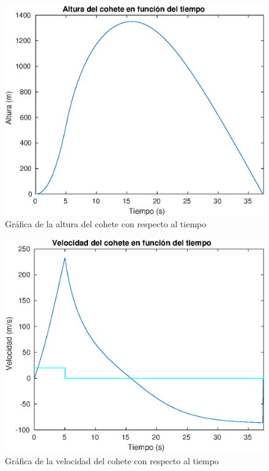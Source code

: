 \documentclass[12pt,letterpaper]{article}
\begin{document}
\begin{figure}[ht!]
  \centering
  \includegraphics[width=0.5\linewidth]{pictures/Ejercicio3/altura_cohete_vs_tiempo.eps}
  \caption{Gráfica de la altura del cohete con respecto al tiempo}
  \label{fig:alt_cohete}
\end{figure}



\begin{figure}[ht!]
  \centering
  \includegraphics[width=0.5\linewidth]{pictures/Ejercicio3/velocidad_cohete_vs_tiempo.eps}
  \caption{Gráfica de la velocidad del cohete con respecto al tiempo}
\end{figure}
\end{document}
